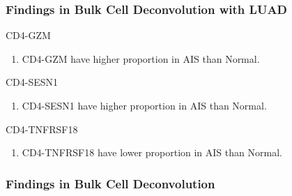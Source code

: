 \documentclass{beamer}
\begin{document}
    \begin{frame}[allowframebreaks]
        \frametitle{Findings in Bulk Cell Deconvolution with LUAD}

        \begin{block}{CD4-GZM}
            \begin{enumerate}
                \item CD4-GZM have higher proportion in AIS than Normal.
            \end{enumerate}
        \end{block}

        \begin{block}{CD4-SESN1}
           \begin{enumerate}
               \item CD4-SESN1 have higher proportion in AIS than Normal.
           \end{enumerate}
        \end{block}

        \begin{block}{CD4-TNFRSF18}
            \begin{enumerate}
                \item CD4-TNFRSF18 have lower proportion in AIS than Normal.
            \end{enumerate}
        \end{block}
    \end{frame}

    \begin{frame}
        \frametitle{Findings in Bulk Cell Deconvolution}
    \end{frame}

%
%
\end{document}
